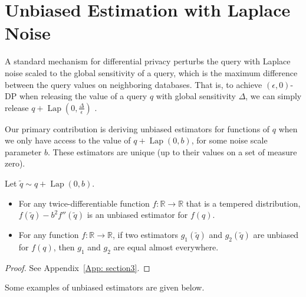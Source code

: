 \documentclass[11pt]{article}
\newcommand{\Lap}{\operatorname{Lap}}
\newcommand{\R}{\mathbb{R}}
\begin{document}
\section{Unbiased Estimation with Laplace Noise}
\label{sec:unbiasLaplace}

A standard mechanism for differential privacy perturbs the query with Laplace noise scaled to the global sensitivity of a query, which is the maximum difference between the query values on neighboring databases. That is, to achieve $(\epsilon,0)$-DP when releasing the value of a query $q$ with global sensitivity $\Delta$, we can simply release $q + \Lap(0,\frac{\Delta}{\epsilon})$ \cite{Dwork_McSherry_Nissim_Smith_2017}.

Our primary contribution is deriving unbiased estimators for functions of $q$ when we only have access to the value of $q + \Lap(0,b)$, for some noise scale parameter $b$. These estimators are unique (up to their values on a set of measure zero).


\begin{theorem}
\label{thm:unbiased}
    \item Let $\tilde{q} \sim q + \Lap(0,b)$. 
    \begin{itemize}
        \item For any twice-differentiable function $f:\R \to \R$ that is a tempered distribution, $f(\tilde{q}) - b^2 f''(\tilde{q})$ is an unbiased estimator for $f(q)$.
        \item For any function $f:\R \to \R$, if two estimators $g_1(\tilde{q})$ and $g_2(\tilde{q})$ are unbiased for $f(q)$, then $g_1$ and $g_2$ are equal almost everywhere.
    \end{itemize}
\end{theorem}

\begin{proof}
    See Appendix~\ref{App: section3}.
\end{proof}

Some examples of unbiased estimators are given below.
\end{document}
